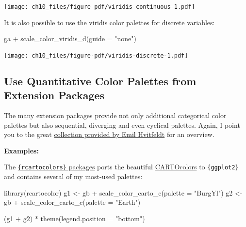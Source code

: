 \documentclass[
  letterpaper,
]{scrbook}
\newenvironment{Shaded}{\begin{snugshade}}{\end{snugshade}}
\newcommand{\AttributeTok}[1]{\textcolor[rgb]{0.40,0.45,0.13}{#1}}
\newcommand{\FunctionTok}[1]{\textcolor[rgb]{0.28,0.35,0.67}{#1}}
\newcommand{\NormalTok}[1]{\textcolor[rgb]{0.00,0.23,0.31}{#1}}
\newcommand{\OtherTok}[1]{\textcolor[rgb]{0.00,0.23,0.31}{#1}}
\newcommand{\SpecialCharTok}[1]{\textcolor[rgb]{0.37,0.37,0.37}{#1}}
\newcommand{\StringTok}[1]{\textcolor[rgb]{0.13,0.47,0.30}{#1}}
\begin{document}
\texttt{[image: ch10\_files/figure-pdf/viridis-continuous-1.pdf]}

It is also possible to use the viridis color palettes for discrete
variables:

\begin{Shaded}
\begin{Highlighting}[]
\NormalTok{ga }\SpecialCharTok{+} \FunctionTok{scale\_color\_viridis\_d}\NormalTok{(}\AttributeTok{guide =} \StringTok{"none"}\NormalTok{)}
\end{Highlighting}
\end{Shaded}

\texttt{[image: ch10\_files/figure-pdf/viridis-discrete-1.pdf]}

\subsection{Use Quantitative Color Palettes from Extension
Packages}\label{use-quantitative-color-palettes-from-extension-packages}

The many extension packages provide not only additional categorical
color palettes but also sequential, diverging and even cyclical
palettes. Again, I point you to the great
\href{https://github.com/EmilHvitfeldt/r-color-palettes/blob/master/README.md\#comprehensive-list-of-color-palettes-in-r}{collection
provided by Emil Hvitfeldt} for an overview.

\textbf{Examples:}

The
\href{https://github.com/Nowosad/rcartocolor}{\texttt{\{rcartocolors\}}
packages} ports the beautiful
\href{https://www.google.com/search?client=firefox-b-d&q=carto+oclors}{CARTOcolors}
to \texttt{\{ggplot2\}} and contains several of my most-used palettes:

\begin{Shaded}
\begin{Highlighting}[]
\FunctionTok{library}\NormalTok{(rcartocolor)}
\NormalTok{g1 }\OtherTok{\textless{}{-}}\NormalTok{ gb }\SpecialCharTok{+} \FunctionTok{scale\_color\_carto\_c}\NormalTok{(}\AttributeTok{palette =} \StringTok{"BurgYl"}\NormalTok{)}
\NormalTok{g2 }\OtherTok{\textless{}{-}}\NormalTok{ gb }\SpecialCharTok{+} \FunctionTok{scale\_color\_carto\_c}\NormalTok{(}\AttributeTok{palette =} \StringTok{"Earth"}\NormalTok{)}

\NormalTok{(g1 }\SpecialCharTok{+}\NormalTok{ g2) }\SpecialCharTok{*} \FunctionTok{theme}\NormalTok{(}\AttributeTok{legend.position =} \StringTok{"bottom"}\NormalTok{)}
\end{Highlighting}
\end{Shaded}
\end{document}
